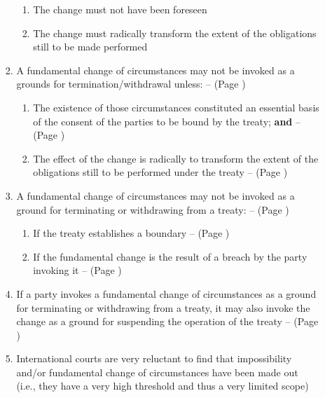 \begin{enumerate}
\begin{enumerate}[resume]
\begin{enumerate}
\begin{enumerate}
                \item The change must not have been foreseen
                \item The change must radically transform the extent of the obligations still to be made performed                
            \end{enumerate}
            \item A fundamental change of circumstances may not be invoked as a grounds for termination/withdrawal unless: --  (Page \pageref{VCLT Art 62})
            \begin{enumerate}
                \item The existence of those circumstances constituted an essential basis of the consent of the parties to be bound by the treaty; \textbf{and} --  (Page \pageref{VCLT Art 62})
                \item The effect of the change is radically to transform the extent of the obligations still to be performed under the treaty --  (Page \pageref{VCLT Art 62})
            \end{enumerate}
            \item A fundamental change of circumstances may not be invoked as a ground for terminating or withdrawing from a treaty: --  (Page \pageref{VCLT Art 62})
            \begin{enumerate}
                \item If the treaty establishes a boundary --  (Page \pageref{VCLT Art 62})
                \item If the fundamental change is the result of a breach by the party invoking it --  (Page \pageref{VCLT Art 62})
            \end{enumerate}
            \item If a party invokes a fundamental change of circumstances as a ground for terminating or withdrawing from a treaty, it may also invoke the change as a ground for suspending the operation of the treaty --  (Page \pageref{VCLT Art 62})
            \item International courts are very reluctant to find that impossibility and/or fundamental change of circumstances have been made out (i.e., they have a very high threshold and thus a very limited scope)
        \end{enumerate}
    \end{enumerate}
\end{enumerate}

